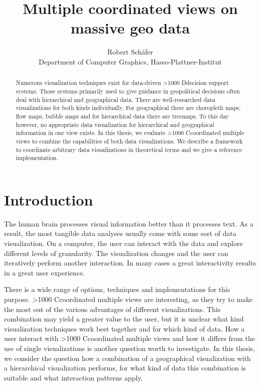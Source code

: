 \documentclass{article}
\newcommand\hmm[1]{\ifnum\ifhmode\spacefactor\else2000\fi>1000 \uppercase{#1}\else#1\fi}
\newcommand{\cmvs}{\hmm{c}oordinated multiple views}
\newcommand{\dss}{\hmm{d}ecision support systems}
\newenvironment{bullshit}{\color{gray}}{\ignorespacesafterend}
\begin{document}
\title{Multiple coordinated views on massive geo data}
\author{Robert Schäfer\\ Department of Computer Graphics, Hasso-Plattner-Institut}
\maketitle
\clearpage

\tableofcontents
\clearpage



\begin{abstract}
  Numerous visualization techniques exist for data-driven \dss{}.
  Those systems primarily used to give guidance in geopolitical decisions often deal with hierarchical and geographical data.
  There are well-researched data visualizations for both kinds individually.
  For geographical there are choropleth maps, flow maps, bubble maps and for hierarchical data there are treemaps.
  To this day however, no appropriate data visualization for hierarchical and geographical information in one view exists.
  In this thesis, we evaluate \cmvs{} to combine the capabilities of both data visualizations.
  We describe a framework to coordinate arbitrary data visualizations in theoretical terms and we give a reference implementation.

\end{abstract}
\clearpage

\section{Introduction}
The human brain processes visual information better than it processes text.
As a result, the most tangible data analyses usually come with some sort of data visualization.
On a computer, the user can interact with the data and explore different levels of granularity.
The visualization changes and the user can iteratively perform another interaction.
In many cases a great interactivity results in a great user experience.

There is a wide range of options, techniques and implementations for this purpose.
\cmvs{} are interesting, as they try to make the most out of the various advantages of different visualizations.
\begin{bullshit}
This combination may yield a greater value to the user, but it is unclear what kind visualization techniques work best together and for which kind of data.
How a user interact with \cmvs{} and how it differs from the use of single visualizations is another question worth to investigate.
In this thesis, we consider the question how a combination of a geographical visualization with a hierarchical visualization performs, for what kind of data this combination is suitable and what interaction patterns apply.
\end{bullshit}
\end{document}
